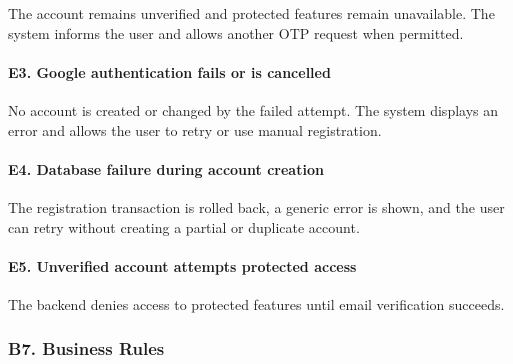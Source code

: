 \documentclass[12pt]{article}
\begin{document}
The account remains unverified and protected features remain unavailable. The system informs the user and allows another OTP request when permitted.
\par\medskip

\hypertarget{sec:e3-google-authentication-fails-or-is-cancelled}{}
\paragraph*{E3. Google authentication fails or is cancelled}
\par\medskip

No account is created or changed by the failed attempt. The system displays an error and allows the user to retry or use manual registration.
\par\medskip

\hypertarget{sec:e4-database-failure-during-account-creation}{}
\paragraph*{E4. Database failure during account creation}
\par\medskip

The registration transaction is rolled back, a generic error is shown, and the user can retry without creating a partial or duplicate account.
\par\medskip

\hypertarget{sec:e5-unverified-account-attempts-protected-access}{}
\paragraph*{E5. Unverified account attempts protected access}
\par\medskip

The backend denies access to protected features until email verification succeeds.
\par\medskip

\hypertarget{sec:b7-business-rules}{}
\subsubsection*{B7. Business Rules}
\par\medskip
\end{document}
